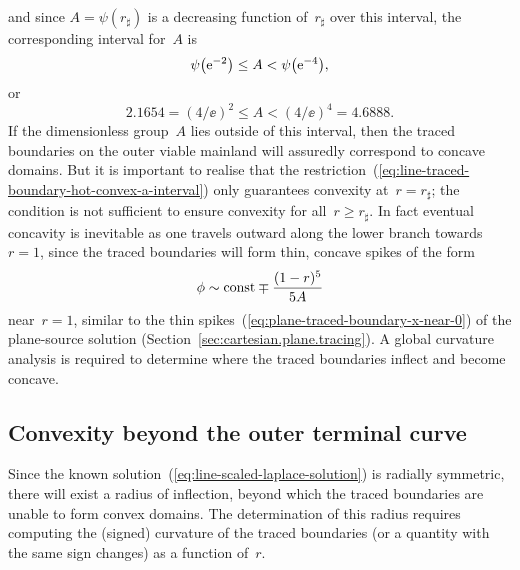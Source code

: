 and since $A = \psi (r_\sharp)$ is a decreasing function of~$r_\sharp$
over this interval,
the corresponding interval for~$A$ is
\[
  \psi \roundbr*{\ee^{-2}} \le A < \psi \roundbr*{\ee^{-4}},
\]
or
\begin{equation}
  2.1654 = (4 / \ee)^2 \le A < (4 / \ee)^4 = 4.6888.
  \label{eq:line-traced-boundary-hot-convex-a-interval}
\end{equation}
If the dimensionless group~$A$ lies outside of this interval,
then the traced boundaries on the outer viable mainland
will assuredly correspond to concave domains.
But it is important to realise that
the restriction~(\ref{eq:line-traced-boundary-hot-convex-a-interval})
only guarantees convexity at~$r = r_\sharp$;
the condition is not sufficient to ensure convexity for all~$r \ge r_\sharp$.
In fact eventual concavity is inevitable
as one travels outward along the lower branch towards~$r = 1$,
since the traced boundaries will form thin, concave spikes of the form
\begin{equation}
  \phi \sim \mathrm{const} \mp \frac{(1 - r)^5}{5 A}
  \label{eq:line-traced-boundary-r-near-1}
\end{equation}
near~$r = 1$,
similar to the thin spikes~(\ref{eq:plane-traced-boundary-x-near-0})
of the plane-source solution (Section~\ref{sec:cartesian.plane.tracing}).
A global curvature analysis is required
to determine where the traced boundaries inflect
and become concave.

\subsection{Convexity beyond the outer terminal curve}
\label{sec:line.convex.beyond}

Since the known solution~(\ref{eq:line-scaled-laplace-solution})
is radially symmetric,
there will exist a radius of inflection,
beyond which the traced boundaries are unable to form convex domains.
The determination of this radius requires
computing the (signed) curvature of the traced boundaries
(or a quantity with the same sign changes)
as a function of~$r$.

